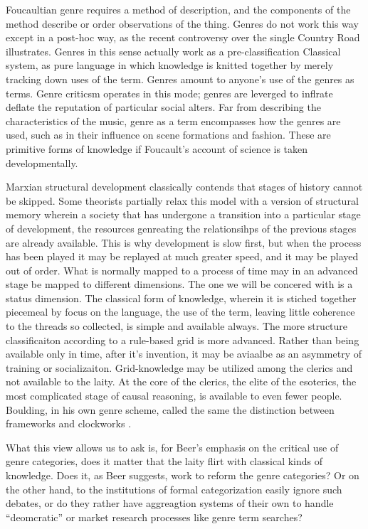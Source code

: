 \documentclass[]{book}
\theoremstyle{definition}
\theoremstyle{definition}
\theoremstyle{definition}
\theoremstyle{remark}
\begin{document}
Foucaultian genre requires a method of description, and the components
of the method describe or order observations of the thing. Genres do not
work this way except in a post-hoc way, as the recent controversy over
the single Country Road illustrates. Genres in this sense actually work
as a pre-classification Classical system, as pure language in which
knowledge is knitted together by merely tracking down uses of the term.
Genres amount to anyone's use of the genres as terms. Genre criticsm
operates in this mode; genres are leverged to inflrate deflate the
reputation of particular social alters. Far from describing the
characteristics of the music, genre as a term encompasses how the genres
are used, such as in their influence on scene formations and fashion.
These are primitive forms of knowledge if Foucault's account of science
is taken developmentally.

Marxian structural development classically contends that stages of
history cannot be skipped. Some theorists partially relax this model
with a version of structural memory wherein a society that has undergone
a transition into a particular stage of development, the resources
genreating the relationsihps of the previous stages are already
available. This is why development is slow first, but when the process
has been played it may be replayed at much greater speed, and it may be
played out of order. What is normally mapped to a process of time may in
an advanced stage be mapped to different dimensions. The one we will be
concered with is a status dimension. The classical form of knowledge,
wherein it is stiched together piecemeal by focus on the language, the
use of the term, leaving little coherence to the threads so collected,
is simple and available always. The more structure classificaiton
according to a rule-based grid is more advanced. Rather than being
available only in time, after it's invention, it may be aviaalbe as an
asymmetry of training or socializaiton. Grid-knowledge may be utilized
among the clerics and not available to the laity. At the core of the
clerics, the elite of the esoterics, the most complicated stage of
causal reasoning, is available to even fewer people. Boulding, in his
own genre scheme, called the same the distinction between frameworks and
clockworks \citep[202]{Boulding1956General}.

What this view allows us to ask is, for Beer's emphasis on the critical
use of genre categories, does it matter that the laity flirt with
classical kinds of knowledge. Does it, as Beer suggests, work to reform
the genre categories? Or on the other hand, to the institutions of
formal categorization easily ignore such debates, or do they rather have
aggreagtion systems of their own to handle ``deomcratic'' or market
research processes like genre term searches?
\end{document}
